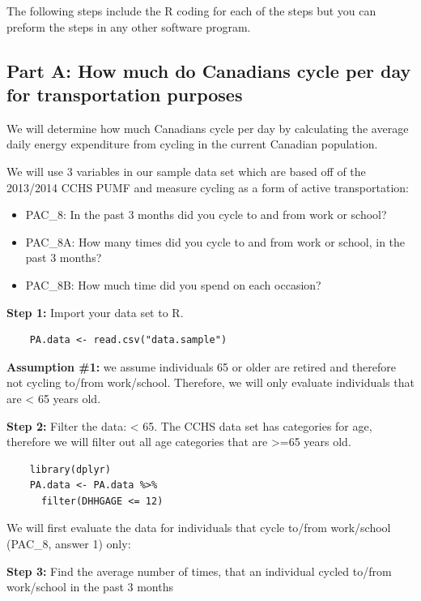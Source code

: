 \documentclass[]{book}
\providecommand{\tightlist}{%
  \setlength{\itemsep}{0pt}\setlength{\parskip}{0pt}}
\begin{document}
The following steps include the R coding for each of the steps but you
can preform the steps in any other software program.

\subsection{Part A: How much do Canadians cycle per day for
transportation
purposes}\label{part-a-how-much-do-canadians-cycle-per-day-for-transportation-purposes}

We will determine how much Canadians cycle per day by calculating the
average daily energy expenditure from cycling in the current Canadian
population.

We will use 3 variables in our sample data set which are based off of
the 2013/2014 CCHS PUMF and measure cycling as a form of active
transportation:

\begin{itemize}
\tightlist
\item
  PAC\_8: In the past 3 months did you cycle to and from work or school?
\item
  PAC\_8A: How many times did you cycle to and from work or school, in
  the past 3 months?
\item
  PAC\_8B: How much time did you spend on each occasion?
\end{itemize}

\textbf{Step 1:} Import your data set to R.

\begin{verbatim}
    PA.data <- read.csv("data.sample")
\end{verbatim}

\textbf{Assumption \#1:} we assume individuals 65 or older are retired
and therefore not cycling to/from work/school. Therefore, we will only
evaluate individuals that are \textless{} 65 years old.

\textbf{Step 2:} Filter the data: \textless{} 65. The CCHS data set has
categories for age, therefore we will filter out all age categories that
are \textgreater{}=65 years old.

\begin{verbatim}
    library(dplyr)
    PA.data <- PA.data %>%
      filter(DHHGAGE <= 12)
\end{verbatim}

We will first evaluate the data for individuals that cycle to/from
work/school (PAC\_8, answer 1) only:

\textbf{Step 3:} Find the average number of times, that an individual
cycled to/from work/school in the past 3 months
\end{document}
